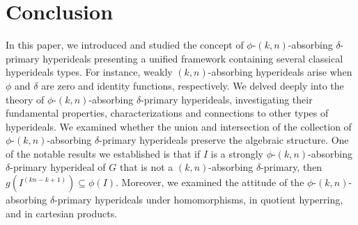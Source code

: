 \documentclass[preprint,review,10pt]{amsart}
\theoremstyle{definition}
\theoremstyle{remark}
\numberwithin{equation}{section}
\begin{document}
\section{Conclusion}


In this paper, we introduced and studied the concept of $\phi$-$(k,n)$-absorbing $\delta$-primary hyperideals presenting a unified framework containing several classical hyperideals types. For instance, weakly $(k,n)$-absorbing hyperideals arise when   $\phi$ and $\delta$ are zero and identity functions, respectively. We delved deeply into the theory of $\phi$-$(k,n)$-absorbing $\delta$-primary hyperideals, investigating their fundamental properties, characterizations and connections to other types of hyperideals. We examined whether the union and intersection of the
collection of $\phi$-$(k,n)$-absorbing $\delta$-primary hyperideals preserve the algebraic structure.
One of the notable results we established is that if $I$ is a strongly $\phi$-$(k,n)$-absorbing $\delta$-primary hyperideal of $G$ that is not a $(k,n)$-absorbing $\delta$-primary, then $g(I^{(kn-k+1)}) \subseteq \phi(I)$. 
Moreover, we examined the attitude of  the $\phi$-$(k,n)$-absorbing $\delta$-primary hyperideals  under homomorphisms, in quotient hyperring,  and in cartesian products.
\end{document}

